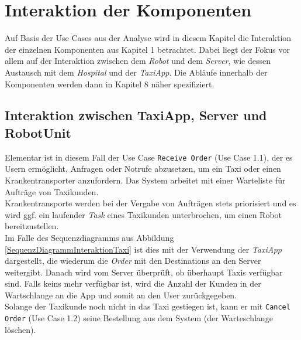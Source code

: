 \section{Interaktion der Komponenten}
Auf Basis der Use Cases aus der Analyse wird in diesem Kapitel die Interaktion der einzelnen Komponenten aus Kapitel 1 betrachtet. 
Dabei liegt der Fokus vor allem auf der Interaktion zwischen dem \emph{Robot} und dem \emph{Server}, wie dessen Austausch mit dem \emph{Hospital} und der \emph{TaxiApp}. 
Die Abläufe innerhalb der Komponenten werden dann in Kapitel 8 näher spezifiziert. \\


\subsection*{Interaktion zwischen TaxiApp, Server und RobotUnit}

Elementar ist in diesem Fall der Use Case \texttt{Receive Order} (Use Case 1.1), der es Usern ermöglicht, Anfragen oder Notrufe abzusetzen, um ein Taxi oder einen Krankentransporter anzufordern. 
Das System arbeitet mit einer Warteliste für Aufträge von Taxikunden. \\
Krankentransporte werden bei der Vergabe von Aufträgen stets priorisiert und es wird ggf. ein laufender \emph{Task} eines Taxikunden unterbrochen, um einen Robot bereitzustellen. \\

Im Falle des Sequenzdiagramms aus Abbildung \ref{SequenzDiagrammInteraktionTaxi} ist dies mit der Verwendung der \emph{TaxiApp} dargestellt, die wiederum die \emph{Order} mit den Destinations an den Server weitergibt.
Danach wird vom Server überprüft, ob überhaupt Taxis verfügbar sind.
Falls keins mehr verfügbar ist, wird die Anzahl der Kunden in der Wartschlange an die App und somit an den User zurückgegeben. \\
Solange der Taxikunde noch nicht in das Taxi gestiegen ist, kann er mit \texttt{Cancel Order} (Use Case 1.2) seine Bestellung aus dem System (der Warteschlange löschen). \\

